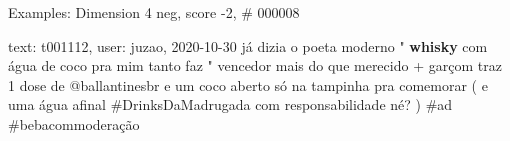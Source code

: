 \begin{frame}{Examples: Dimension 4 neg, score -2, \# 000008}
\footnotesize
\begin{alertblock}{text: t001112, user: juzao, 2020-10-30}
já dizia o poeta moderno " \textbf{whisky} com água de coco pra mim tanto faz " 
vencedor mais do que merecido \textbf{} +  
garçom traz 1 dose de @ballantinesbr e um coco aberto só na tampinha pra 
comemorar ( e uma água afinal \#DrinksDaMadrugada com responsabilidade né? ) 
\#ad \#bebacommoderação 
\end{alertblock}
\end{frame}

